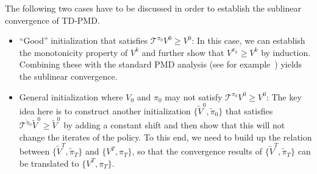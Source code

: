 \documentclass[10pt]{article}
\newcommand{\calT}{\mathcal{T}}
\theoremstyle{plain}
\theoremstyle{definition}
\begin{document}
The following two cases have to be discussed in order to establish the sublinear convergence of TD-PMD.

\begin{itemize}
    \item ``Good'' initialization that satisfies $\calT^{\pi_0} V^0 \geq V^0$: %
    In this case, we can establish the monotonicity property of $V^k$ and further show that  $V^{\pi_k}\geq V^k$ by induction. Combining these with the standard PMD analysis (see for example~\cite{Xiao_2022,Lan_2021}) yields the sublinear convergence.%
    \item General initialization where $V_0$ and $\pi_0$ may not satisfy $\calT^{\pi_0} V^0 \geq V^0$:  %
    The key idea here is to construct another initialization $\{\tilde{V}^0, \tilde{\pi}_0\}$ that satisfies $\calT^{\tilde{\pi}_0}\tilde{V}^0 \geq \tilde{V}^0$ by adding a constant shift and then show that this will not change the iterates of the policy. To this end,  we need to  build up the  relation between $\{ \tilde{V}^T, \tilde{\pi}_T \}$ and $\{ V^T, \pi_T \}$, so that the convergence results of $\{ \tilde{V}^T, \tilde{\pi}_T \}$ can be translated to $\{ V^T, \pi_T \}$. %
\end{itemize}
 
\end{document}
